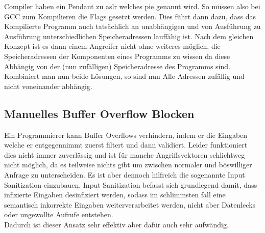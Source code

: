 Compiler haben ein Pendant zu \gls*{aslr} welches \gls*{pie}
genannt wird. So müssen also bei GCC zum Kompilieren die Flags 
gesetzt werden. Dies führt dann dazu, dass das Kompilierte Programm auch tatsächlich an
unabhängigen und von Ausführung zu Ausführung unterschiedlichen Speicheradressen lauffähig
ist.
Nach dem gleichen Konzept ist es dann einem Angreifer nicht ohne weiteres möglich, die
Speicheradressen der Komponenten eines Programms zu wissen da diese Abhängig
von der (nun zufälligen) Speicheradresse des Programms sind. Kombiniert man nun beide Lösungen,
so sind nun Alle Adressen zufällig und nicht voneinander abhängig.

\subsection{Manuelles Buffer Overflow Blocken}
Ein Programmierer kann Buffer Overflows verhindern, indem er die Eingaben
welche er entgegennimmt zuerst filtert und dann validiert. Leider funktioniert
dies nicht immer zuverlässig und ist für manche Angriffsvektoren schlichtweg nicht
möglich, da es teilweise nichts gibt um zwischen normaler und böswilliger Anfrage zu
unterscheiden. Es ist aber dennoch hilfreich die sogenannte Input Sanitization einzubauen.
Input Sanitization befasst sich grundlegend damit, dass infizierte Eingaben desinfiziert
werden, sodass im schlimmsten fall eine semantisch inkorrekte Eingaben weiterverarbeitet
werden, nicht aber Datenlecks oder ungewollte Aufrufe entstehen. \cite{sanitize} \\
Dadurch ist dieser Ansatz sehr effektiv aber dafür auch sehr aufwändig.




